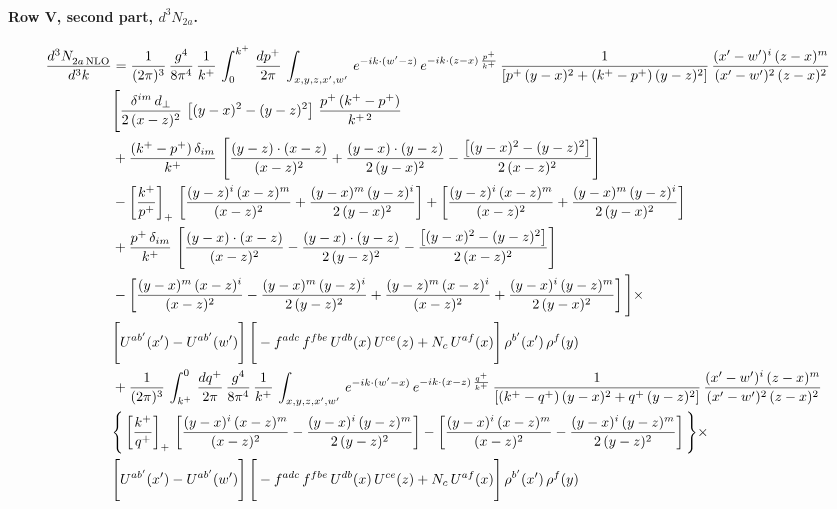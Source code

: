 \documentclass[10pt]{article}
\numberwithin{equation}{section}
\begin{document}
\paragraph{Row V, second part, $d^3N_{2a}$.}
\begin{align}
    \frac{d^{3}N_{2a\,\rm NLO}^{\rm}}{d^{3}k}  & =   \frac{1}{(2\pi)^{3}}\, \frac{g^{4}}{8\pi^{4}}\,\frac{1}{k^{+}}\,\int_{0}^{k^{+}}\, \frac{dp^{+}}{2\pi}\,\int_{x,y,z,x',w'}\,e^{-ik\cdot(w'-z)}\,e^{-ik\cdot (z-x)\,\frac{p^{+}}{k^{+}}}\,\frac{1}{\left[p^{+}\,(y-x)^{2}+(k^{+}-p^{+})\,(y-z)^{2}\right]}\, \frac{(x'-w')^{i}\,(z-x)^{m}}{(x'-w')^{2}\,(z-x)^{2}} \notag \\ & \Bigg[\frac{\delta^{im}\,d_{\perp}}{2\,(x-z)^{2}}\,\left[(y-x)^{2}-(y-z)^{2}\right]\,\frac{p^{+}\,(k^{+}-p^{+})}{k^{+\,2}}\notag \\ & +\frac{(k^{+}-p^{+})\,\delta_{im}}{k^{+}}\,\left[\frac{(y-z)\cdot (x-z)}{(x-z)^{2}}+\frac{(y-x)\cdot (y-z)}{2\,(y-x)^{2}}-\frac{\left[(y-x)^{2}-(y-z)^{2}\right]}{2\,(x-z)^{2}}\right]\notag \\ & -\left[\frac{k^{+}}{p^{+}}\right]_{+}\,\left[\frac{(y-z)^{i}\,(x-z)^{m}}{(x-z)^{2}}+\frac{(y-x)^{m}\,(y-z)^{i}}{2\,(y-x)^{2}}\right]+ \left[\frac{(y-z)^{i}\,(x-z)^{m}}{(x-z)^{2}}+\frac{(y-x)^{m}\,(y-z)^{i}}{2\,(y-x)^{2}}\right]\notag \\ & +\frac{p^{+}\,\delta_{im}}{k^{+}}\,\left[\frac{(y-x)\cdot (x-z)}{(x-z)^{2}}-\frac{(y-x)\cdot (y-z)}{2\,(y-z)^{2}}-\frac{\left[(y-x)^{2}-(y-z)^{2}\right]}{2\,(x-z)^{2}}\right]\notag \\ &-\left[\frac{(y-x)^{m}\,(x-z)^{i}}{(x-z)^{2}}-\frac{(y-x)^{m}\,(y-z)^{i}}{2\,(y-z)^{2}}+\frac{(y-z)^{m}\,(x-z)^{i}}{(x-z)^{2}}+\frac{(y-x)^{i}\,(y-z)^{m}}{2\,(y-x)^{2}}\right]\Bigg]\times \notag \\ & \Bigg[U^{ab'}(x')-U^{ab'}(w')\Bigg]\,\Bigg[-f^{adc}\,f^{fbe}\,U^{db}(x)\,U^{ce}(z)+N_{c}\,U^{af}(x)\Bigg]\,\rho^{b'}(x')\,\rho^{f}(y) \notag \\
& + \frac{1}{(2\pi)^{3}}\,\int^{0}_{k^{+}}\, \frac{dq^{+}}{2\pi} \,\frac{g^{4}}{8\pi^{4}}\,\frac{1}{k^{+}}\, \int_{x,y,z,x',w'}\,e^{-ik\cdot(w'-x)}\,e^{-ik\cdot (x-z)\,\frac{q^{+}}{k^{+}}}\, \frac{1}{\left[(k^{+}-q^{+})\,(y-x)^{2}+q^{+}\,(y-z)^{2}\right]}\, \frac{(x'-w')^{i}\,(z-x)^{m}}{(x'-w')^{2}\,(z-x)^{2}} \notag \\ &\Bigg\{\left[\frac{k^{+}}{q^{+}}\right]_{+}\,\left[\frac{(y-x)^{i}\,(x-z)^{m}}{(x-z)^{2}}-\frac{(y-x)^{i}\,(y-z)^{m}}{2\,(y-z)^{2}}\right] -\left[\frac{(y-x)^{i}\,(x-z)^{m}}{(x-z)^{2}}-\frac{(y-x)^{i}\,(y-z)^{m}}{2\,(y-z)^{2}}\right]\Bigg\}\times\,\notag \\ & \Bigg[U^{ab'}(x')-U^{ab'}(w')\Bigg]\,\Bigg[-f^{adc}\,f^{fbe}\,U^{db}(x)\,U^{ce}(z)+N_{c}\,U^{af}(x)\Bigg]\,\rho^{b'}(x')\,\rho^{f}(y) \label{eq:F:G1V2a}
\end{align}
\end{document}
